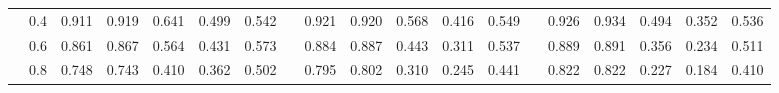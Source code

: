 \begin{table}
{\begin{tabular}{llccccccccccccccccc}
 & 0.4 & \cellcolor[HTML]{D4EDF4}0.911 & \cellcolor[HTML]{C7E7F1}0.919 & \cellcolor[HTML]{FED687}0.641 & \cellcolor[HTML]{FEBF70}0.499 & \cellcolor[HTML]{FEC576}0.542 & & \cellcolor[HTML]{C0E3EF}0.921 & \cellcolor[HTML]{C2E4EF}0.920 & \cellcolor[HTML]{FED485}0.568 & \cellcolor[HTML]{FEBF71}0.416 & \cellcolor[HTML]{FFD182}0.549 & & \cellcolor[HTML]{B4DDEC}0.926 & \cellcolor[HTML]{A4D3E6}0.934 & \cellcolor[HTML]{FFCE7F}0.494 & \cellcolor[HTML]{FEBE6F}0.352 & \cellcolor[HTML]{FED485}0.536 \\
 & 0.6 & \cellcolor[HTML]{F7FBD1}0.861 & \cellcolor[HTML]{F4FAD6}0.867 & \cellcolor[HTML]{FEC87A}0.564 & \cellcolor[HTML]{FEB668}0.431 & \cellcolor[HTML]{FFCA7B}0.573 & & \cellcolor[HTML]{E7F5ED}0.884 & \cellcolor[HTML]{E5F5F0}0.887 & \cellcolor[HTML]{FEC374}0.443 & \cellcolor[HTML]{FEB467}0.311 & \cellcolor[HTML]{FFCF80}0.537 & & \cellcolor[HTML]{E1F3F7}0.889 & \cellcolor[HTML]{E0F3F8}0.891 & \cellcolor[HTML]{FEBE70}0.356 & \cellcolor[HTML]{FDB265}0.234 & \cellcolor[HTML]{FFD181}0.511 \\
 & 0.8 & \cellcolor[HTML]{FFEA9F}0.748 & \cellcolor[HTML]{FFE99E}0.743 & \cellcolor[HTML]{FDB366}0.410 & \cellcolor[HTML]{FDAE61}0.362 & \cellcolor[HTML]{FEBF71}0.502 & & \cellcolor[HTML]{FFFAB8}0.795 & \cellcolor[HTML]{FFFCBA}0.802 & \cellcolor[HTML]{FEB467}0.310 & \cellcolor[HTML]{FDAE61}0.245 & \cellcolor[HTML]{FEC274}0.441 & & \cellcolor[HTML]{FBFDC9}0.822 & \cellcolor[HTML]{FBFDC9}0.822 & \cellcolor[HTML]{FDB264}0.227 & \cellcolor[HTML]{FDAE61}0.184 & \cellcolor[HTML]{FEC475}0.410 \\
\hline
\hline
\end{tabular}%
}
\end{table}

